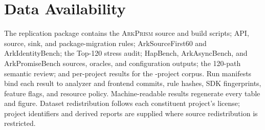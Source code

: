 \documentclass[acmsmall,screen,review,anonymous]{acmart}
\newcommand{\mytoolname}{\textsc{ArkPrism}}
\newcommand{\mytool}{\mytoolname\xspace}
\begin{document}


\maketitle










\section*{Data Availability}
The replication package contains the \mytool source and build scripts; API, source, sink, and package-migration rules; ArkSourceFirst60 and ArkIdentityBench; the Top-120 stress audit; HapBench, ArkAsyncBench, and ArkPromiseBench sources, oracles, and configuration outputs; the 120-path semantic review; and per-project results for the \CorpusProjects{}-project corpus. Run manifests bind each result to analyzer and frontend commits, rule hashes, SDK fingerprints, feature flags, and resource policy. Machine-readable results regenerate every table and figure. Dataset redistribution follows each constituent project's license; project identifiers and derived reports are supplied where source redistribution is restricted.

\appendix




\end{document}
